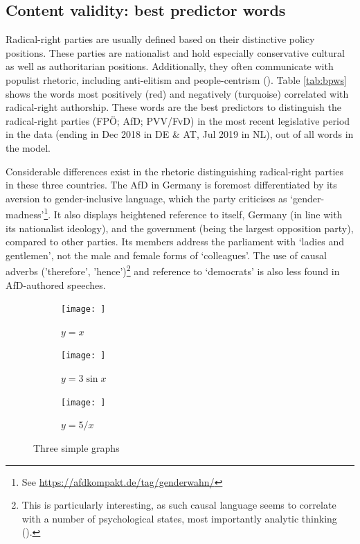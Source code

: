 \documentclass{article}
\begin{document}
\subsection{Content validity: best predictor words}

Radical-right parties are usually defined based on their distinctive policy positions. These parties are nationalist and hold especially conservative cultural as well as authoritarian positions. Additionally, they often communicate with populist rhetoric, including anti-elitism and people-centrism (\cite{Mudde2007}). Table \ref{tab:bpws} shows the words most positively (red) and negatively (turquoise) correlated with radical-right authorship. These words are the best predictors to distinguish the radical-right parties (FPÖ; AfD; PVV/FvD) in the most recent legislative period in the data (ending in Dec 2018 in DE \& AT, Jul 2019 in NL), out of all words in the model. \par

Considerable differences exist in the rhetoric distinguishing radical-right parties in these three countries. The AfD in Germany is foremost differentiated by its aversion to gender-inclusive language, which the party criticises as ‘gender-madness’\footnote{See \url{https://afdkompakt.de/tag/genderwahn/}}. It also displays heightened reference to itself, Germany (in line with its nationalist ideology), and the government (being the largest opposition party), compared to other parties. Its members address the parliament with ‘ladies and gentlemen’, not the male and female forms of ‘colleagues’. The use of causal adverbs ('therefore', 'hence')\footnote{This is particularly interesting, as such causal language seems to correlate with a number of psychological states, most importantly analytic thinking  (\cite{Pennebaker2003, Pennebaker2011}).} and reference to ‘democrats’ is also less found in AfD-authored speeches. \par

\begin{figure}
     \centering
     \begin{subfigure}[b]{0.3\textwidth}
         \centering
         \texttt{[image: ]}
         \caption{$y=x$}
         \label{fig:y equals x}
     \end{subfigure}
     \hfill
     \begin{subfigure}[b]{0.3\textwidth}
         \centering
         \texttt{[image: ]}
         \caption{$y=3\sin x$}
         \label{fig:three sin x}
     \end{subfigure}
     \hfill
     \begin{subfigure}[b]{0.3\textwidth}
         \centering
         \texttt{[image: ]}
         \caption{$y=5/x$}
         \label{fig:five over x}
     \end{subfigure}
        \caption{Three simple graphs}
        \label{fig:three graphs}
\end{figure}
\end{document}
